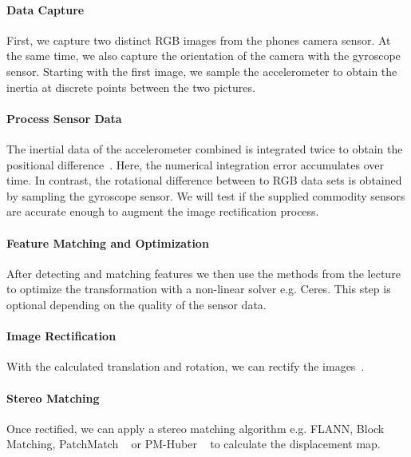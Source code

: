 \documentclass[a4paper,pagesize 10pt]{scrartcl}
\begin{document}

\paragraph{Data Capture}
First, we capture two distinct RGB images from the phones camera sensor. At the same time, we also capture the orientation of the camera with the gyroscope sensor. Starting with the first image, we sample the accelerometer to obtain the inertia at discrete points between the two pictures.
\paragraph{Process Sensor Data}
The inertial data of the accelerometer combined is integrated twice to obtain the positional difference~\cite{Seifert2007,Kok2017}. Here, the numerical integration error accumulates over time. In contrast, the rotational difference between to RGB data sets is obtained by sampling the gyroscope sensor. We will test if the supplied commodity sensors are accurate enough to augment the image rectification process.
\paragraph{Feature Matching and Optimization}
After detecting and matching features we then use the methods from the lecture to optimize the transformation with a non-linear solver e.g. Ceres. This step is optional depending on the quality of the sensor data.
\paragraph{Image Rectification}
With the calculated translation and rotation, we can rectify the images~\cite{loop1999, Fusiello2000}. 
\paragraph{Stereo Matching}
Once rectified, we can apply a stereo matching algorithm e.g. FLANN, Block Matching, PatchMatch ~\cite{Bleyer2011} or PM-Huber ~\cite{Heise2013} to calculate the displacement map. 
\end{document}
